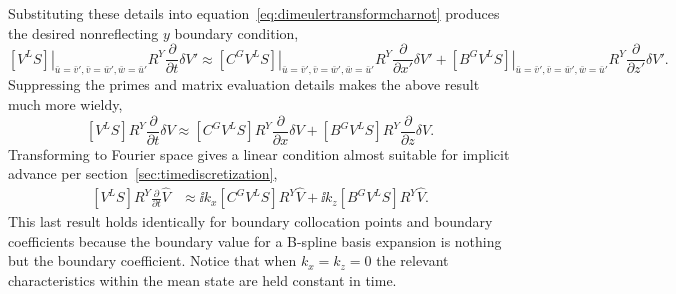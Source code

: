 Substituting these details into equation~\eqref{eq:dimeulertransformcharnot}
produces the desired nonreflecting $y$ boundary condition,
\[
\label{eq:dimeulertransformcharnotYwieldy}
\left.\left[
  V^L S
\right]\right|_{\bar{u}=\bar{v}', \bar{v}=\bar{w}', \bar{w}=\bar{u}'}
  R^Y
  \frac{\partial}{\partial{}t}
  \delta{}V'
\approx
\left.\left[
  C^G V^L S
\right]\right|_{\bar{u}=\bar{v}', \bar{v}=\bar{w}', \bar{w}=\bar{u}'}
  R^Y
  \frac{\partial}{\partial{}x'}
  \delta{}V'
  +
\left.\left[
  B^G V^L S
\right]\right|_{\bar{u}=\bar{v}', \bar{v}=\bar{w}', \bar{w}=\bar{u}'}
  R^Y
  \frac{\partial}{\partial{}z'}
  \delta{}V'
.
\]
Suppressing the primes and matrix evaluation details makes the above result
much more wieldy,
\[
\label{eq:dimeulertransformcharnotYphys}
  \left[V^L S\right]
  R^Y
  \frac{\partial}{\partial{}t}
  \delta{}V
\approx
  \left[C^G V^L S\right]
  R^Y
  \frac{\partial}{\partial{}x}
  \delta{}V
  +
  \left[B^G V^L S\right]
  R^Y
  \frac{\partial}{\partial{}z}
  \delta{}V
.
\]
Transforming to Fourier space gives a linear condition almost suitable for
implicit advance per section~\ref{sec:timediscretization},
\begin{align}
\label{eq:dimeulertransformcharnotYwave}
  \left[V^L S\right]
  R^Y
  \frac{\partial}{\partial{}t}
  \hat{V}
&\approx
  \ii k_x
  \left[C^G V^L S\right]
  R^Y
  \hat{V}
  +
  \ii k_z
  \left[B^G V^L S\right]
  R^Y
  \hat{V}
.
\end{align}
This last result holds identically for boundary collocation points and boundary
coefficients because the boundary value for a B-spline basis expansion is
nothing but the boundary coefficient.  Notice that when $k_x=k_z=0$ the
relevant characteristics within the mean state are held constant in time.

